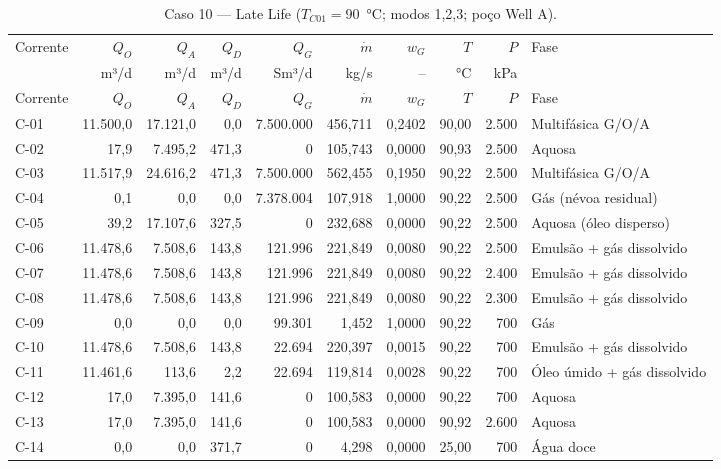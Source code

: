 \documentclass[11pt,a4paper]{article}
\numberwithin{equation}{section}
\numberwithin{table}{section}
\numberwithin{figure}{section}
\begin{document}
{\footnotesize\setlength{\tabcolsep}{3pt}\begin{longtable}{lrrrrrrrrL{2.5cm}}
\caption{Caso 10 --- Late Life ($T_{C01}=90$~°C; modos 1,2,3; poço Well A).}\\\toprule
Corrente & $Q_O$ & $Q_A$ & $Q_D$ & $Q_G$ & $\dot m$ & $w_G$ & $T$ & $P$ & Fase\\ & m³/d & m³/d & m³/d & Sm³/d & kg/s & -- & °C & kPa & \\\midrule\endfirsthead
\toprule Corrente & $Q_O$ & $Q_A$ & $Q_D$ & $Q_G$ & $\dot m$ & $w_G$ & $T$ & $P$ & Fase\\\midrule\endhead
C-01 & 11.500,0 & 17.121,0 & 0,0 & 7.500.000 & 456,711 & 0,2402 & 90,00 & 2.500 & {\scriptsize Multifásica G/O/A}\\
C-02 & 17,9 & 7.495,2 & 471,3 & 0 & 105,743 & 0,0000 & 90,93 & 2.500 & {\scriptsize Aquosa}\\
C-03 & 11.517,9 & 24.616,2 & 471,3 & 7.500.000 & 562,455 & 0,1950 & 90,22 & 2.500 & {\scriptsize Multifásica G/O/A}\\
C-04 & 0,1 & 0,0 & 0,0 & 7.378.004 & 107,918 & 1,0000 & 90,22 & 2.500 & {\scriptsize Gás (névoa residual)}\\
C-05 & 39,2 & 17.107,6 & 327,5 & 0 & 232,688 & 0,0000 & 90,22 & 2.500 & {\scriptsize Aquosa (óleo disperso)}\\
C-06 & 11.478,6 & 7.508,6 & 143,8 & 121.996 & 221,849 & 0,0080 & 90,22 & 2.500 & {\scriptsize Emulsão + gás dissolvido}\\
C-07 & 11.478,6 & 7.508,6 & 143,8 & 121.996 & 221,849 & 0,0080 & 90,22 & 2.400 & {\scriptsize Emulsão + gás dissolvido}\\
C-08 & 11.478,6 & 7.508,6 & 143,8 & 121.996 & 221,849 & 0,0080 & 90,22 & 2.300 & {\scriptsize Emulsão + gás dissolvido}\\
C-09 & 0,0 & 0,0 & 0,0 & 99.301 & 1,452 & 1,0000 & 90,22 & 700 & {\scriptsize Gás}\\
C-10 & 11.478,6 & 7.508,6 & 143,8 & 22.694 & 220,397 & 0,0015 & 90,22 & 700 & {\scriptsize Emulsão + gás dissolvido}\\
C-11 & 11.461,6 & 113,6 & 2,2 & 22.694 & 119,814 & 0,0028 & 90,22 & 700 & {\scriptsize Óleo úmido + gás dissolvido}\\
C-12 & 17,0 & 7.395,0 & 141,6 & 0 & 100,583 & 0,0000 & 90,22 & 700 & {\scriptsize Aquosa}\\
C-13 & 17,0 & 7.395,0 & 141,6 & 0 & 100,583 & 0,0000 & 90,92 & 2.600 & {\scriptsize Aquosa}\\
C-14 & 0,0 & 0,0 & 371,7 & 0 & 4,298 & 0,0000 & 25,00 & 700 & {\scriptsize Água doce}\\

\end{longtable}}
\end{document}
